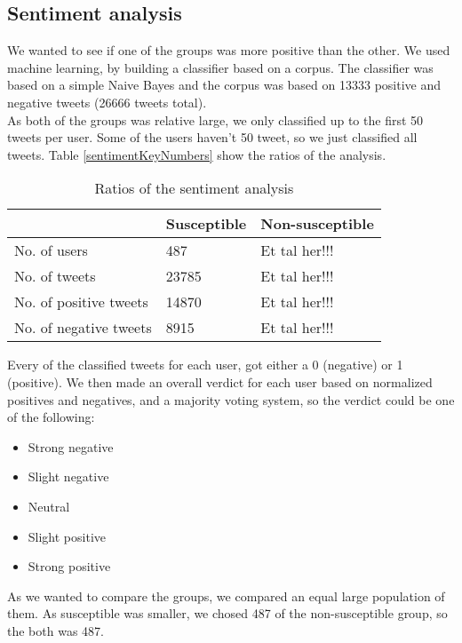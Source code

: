 \documentclass[10pt]{IEEEtran}
\begin{document}
\subsection{Sentiment analysis}
We wanted to see if one of the groups was more positive than the other. We used machine learning, by building a classifier based on a corpus. The classifier was based on a simple Naive Bayes and the corpus was based on 13333 positive and negative tweets (26666 tweets total). \\
As both of the groups was relative large, we only classified up to the first 50 tweets per user. Some of the users haven't 50 tweet, so we just classified all tweets. 
Table \ref{sentimentKeyNumbers} show the ratios of the analysis. 

\begin{table}[h]
\centering
\begin{tabular}{lll}
\hline
                       & Susceptible & Non-susceptible \\ \hline
No. of users           & 487         & Et tal her!!!   \\
No. of tweets          & 23785       & Et tal her!!!   \\
No. of positive tweets & 14870       & Et tal her!!!   \\
No. of negative tweets & 8915        & Et tal her!!!   \\ \hline
\end{tabular}
\caption{Ratios of the sentiment analysis}
\label{tab:sentimentKeyNumbers}
\end{table}

Every of the classified tweets for each user, got either a 0 (negative) or 1 (positive). We then made an overall verdict for each user based on normalized positives and negatives, and a majority voting system, so the verdict could be one of the following:

\begin{itemize}
  \item Strong negative
  \item Slight negative
  \item Neutral
  \item Slight positive
  \item Strong positive\\
\end{itemize}

As we wanted to compare the groups, we compared an equal large population of them. As susceptible was smaller, we chosed 487 of the non-susceptible group, so the both was 487.  \\
\end{document}
